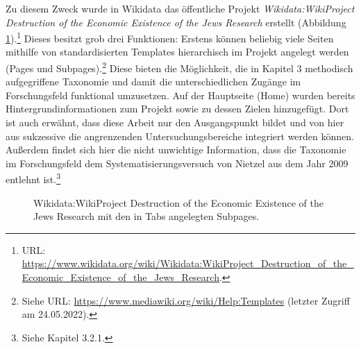 Zu diesem Zweck wurde in Wikidata das öffentliche Projekt \textit{Wikidata:WikiProject Destruction of the Economic Existence of the Jews Research} erstellt (Abbildung \ref{fig:wikidataprojecttabs}).\footnote{URL: \url{https://www.wikidata.org/wiki/Wikidata:WikiProject_Destruction_of_the_Economic_Existence_of_the_Jews_Research}.} Dieses besitzt grob drei Funktionen: Erstens können beliebig viele Seiten mithilfe von standardisierten Templates hierarchisch im Projekt angelegt werden (Pages und Subpages).\footnote{Siehe URL: \url{https://www.mediawiki.org/wiki/Help:Templates} (letzter Zugriff am 24.05.2022).} Diese bieten die Möglichkeit, die in Kapitel 3 methodisch aufgegriffene Taxonomie und damit die unterschiedlichen Zugänge im Forschungsfeld funktional umzusetzen. Auf der Hauptseite (Home) wurden bereits Hintergrundinformationen zum Projekt sowie zu dessen Zielen hinzugefügt. Dort ist auch erwähnt, dass diese Arbeit nur den Ausgangspunkt bildet und von hier aus sukzessive die angrenzenden Untersuchungsbereiche integriert werden können. Außerdem findet sich hier die nicht unwichtige Information, dass die Taxonomie im Forschungsfeld dem Systematisierungsversuch von Nietzel aus dem Jahr 2009 entlehnt ist.\footnote{Siehe Kapitel 3.2.1.}

\begin{figure}[h]
    \centering
    \caption[Wikidata:WikiProject Destruction of the Economic Existence of the Jews Research]{Wikidata:WikiProject Destruction of the Economic Existence of the Jews Research mit den in Tabs angelegten Subpages.}
    \label{fig:wikidataprojecttabs}
\end{figure}

